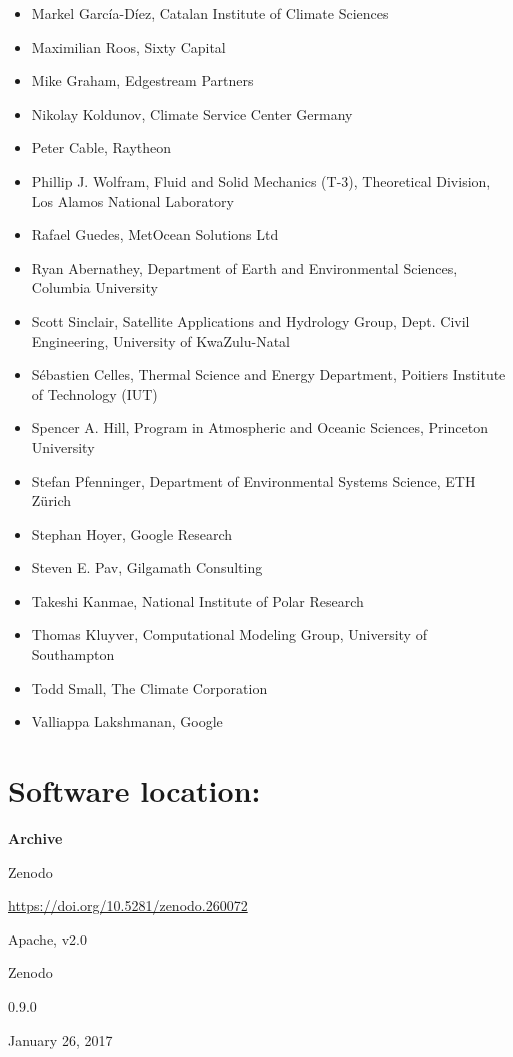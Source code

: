\documentclass{jors}
\begin{document}
\begin{itemize}
\item Markel García-Díez, Catalan Institute of Climate Sciences
\item Maximilian Roos, Sixty Capital
\item Mike Graham, Edgestream Partners
\item Nikolay Koldunov, Climate Service Center Germany
\item Peter Cable, Raytheon
\item Phillip J. Wolfram, Fluid and Solid Mechanics (T-3), Theoretical Division, Los Alamos National Laboratory
\item Rafael Guedes, MetOcean Solutions Ltd
\item Ryan Abernathey, Department of Earth and Environmental Sciences, Columbia University
\item Scott Sinclair, Satellite Applications and Hydrology Group, Dept. Civil Engineering, University of KwaZulu-Natal
\item S\'ebastien Celles, Thermal Science and Energy Department, Poitiers Institute of Technology (IUT)
\item Spencer A. Hill, Program in Atmospheric and Oceanic Sciences, Princeton University
\item Stefan Pfenninger, Department of Environmental Systems Science, ETH Zürich
\item Stephan Hoyer, Google Research
\item Steven E. Pav, Gilgamath Consulting
\item Takeshi Kanmae, National Institute of Polar Research
\item Thomas Kluyver, Computational Modeling Group, University of Southampton
\item Todd Small, The Climate Corporation
\item Valliappa Lakshmanan, Google
\end{itemize}

\section*{Software location:}

{\bf Archive}

\begin{description}[noitemsep,topsep=0pt]
	\item[Name:] Zenodo
	\item[Persistent identifier:] \url{https://doi.org/10.5281/zenodo.260072}
	\item[Licence:] Apache, v2.0
	\item[Publisher:]  Zenodo
	\item[Version published:] 0.9.0
	\item[Date published:] January 26, 2017
\end{description}
\end{document}
